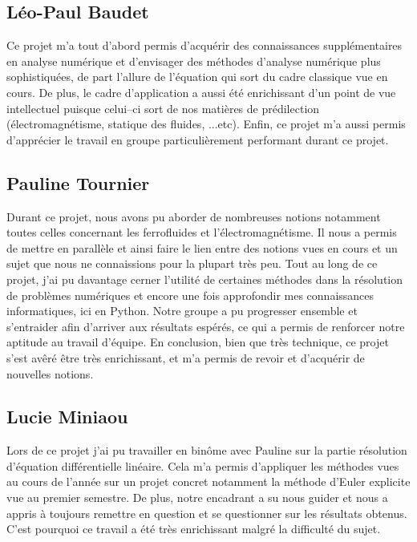 \documentclass[10pt,a4paper]{article}
\begin{document}
\subsection{Léo-Paul Baudet}
Ce projet m'a tout d'abord permis d'acquérir des connaissances supplémentaires en analyse numérique et d'envisager des méthodes d'analyse numérique plus sophistiquées, de part l'allure de l'équation qui sort du cadre classique vue en cours. De plus, le cadre d'application a aussi été enrichissant d'un point de vue intellectuel puisque celui--ci sort de nos matières de prédilection (électromagnétisme, statique des fluides, ...etc). Enfin, ce projet m'a aussi permis d'apprécier le travail en groupe particulièrement performant durant ce projet.
\subsection{Pauline Tournier}
Durant ce projet, nous avons pu aborder de nombreuses notions notamment toutes celles concernant les ferrofluides et l’électromagnétisme. Il nous a permis de mettre en parallèle et ainsi faire le lien entre des notions vues en cours et un sujet que nous ne connaissions pour la plupart très peu. Tout au long de ce projet, j’ai pu davantage cerner l’utilité de certaines méthodes dans la résolution de problèmes numériques et encore une fois approfondir mes connaissances informatiques, ici en Python. Notre groupe a pu progresser ensemble et s’entraider afin d’arriver aux résultats espérés, ce qui a permis de renforcer notre aptitude au travail d’équipe. En conclusion, bien que très technique, ce projet s’est avêré être très enrichissant, et m’a permis de revoir et d’acquérir de nouvelles notions.
\subsection{Lucie Miniaou}
Lors de ce projet j’ai pu travailler en binôme avec Pauline sur la partie résolution d’équation différentielle linéaire. Cela m’a permis d’appliquer les méthodes vues au cours de l’année sur un projet concret notamment la méthode d’Euler explicite vue au premier semestre. De plus, notre encadrant a su nous guider et nous a appris à toujours remettre en question et se questionner sur les résultats obtenus. C’est pourquoi ce travail a été très enrichissant malgré la difficulté du sujet.
\end{document}
